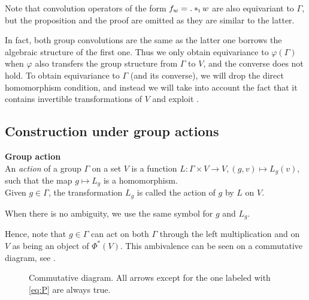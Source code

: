 \begin{remark}Note that convolution operators of the form $f_w = . \ast_{\operatorname{\textsc{i}}} w$ are also equivariant to $\Gamma$, but the proposition and the proof are omitted as they are similar to the latter.
\end{remark}

In fact, both group convolutions are the same as the latter one borrows the algebraic structure of the first one. Thus we only obtain equivariance to $\varphi(\Gamma)$ when $\varphi$ also transfers the group structure from $\Gamma$ to $V$, and the converse does not hold. To obtain equivariance to $\Gamma$ (and its converse), we will drop the direct homomorphism condition, and instead we will take into account the fact that it contains invertible transformations of $V$ and exploit .

\subsection{Construction under group actions}
\label{sec:groupaction}

\begin{definition}\textbf{Group action}\\
An \emph{action} of a group $\Gamma$ on a set $V$ is a function $L: \Gamma \times V \rightarrow V, (g,v) \mapsto L_g(v)$, such that the map $g \mapsto L_g$ is a homomorphism.\\
Given $g \in \Gamma$, the transformation $L_g$ is called the action of $g$ by $L$ on $V$.
\end{definition}

\begin{remark}
When there is no ambiguity, we use the same symbol for $g$ and $L_g$. 
\end{remark}

Hence, note that $g \in \Gamma$ can act on both $\Gamma$ through the left multiplication and on $V$ as being an object of $\Phi^{*}(V)$. This ambivalence can be seen on a commutative diagram, see .%

\begin{figure}[H]
\centering
{}
\caption{Commutative diagram. All arrows except for the one labeled with \eqref{eq:P} are always true.}
\label{fig:com}
\end{figure}

